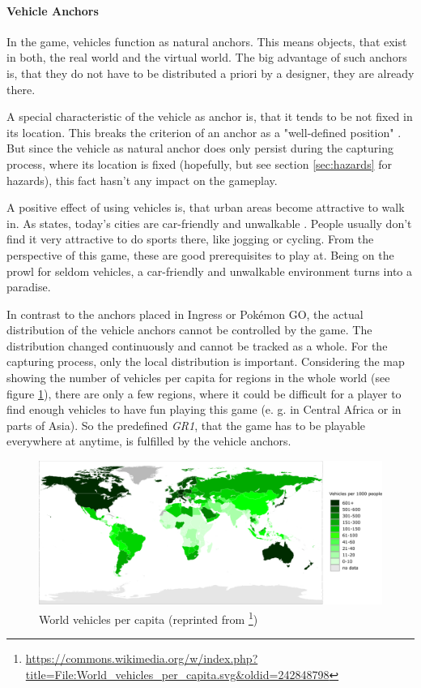 \paragraph{Vehicle Anchors}\label{par:vehicleAnchors}
In the game, vehicles function as natural anchors. This means objects, that exist in both, the real world and the virtual world. The big advantage of such anchors is, that they do not have to be distributed a priori by a designer, they are already there.

A special characteristic of the vehicle as anchor is, that it tends to be not fixed in its location. This breaks the criterion of an anchor as a "well-defined position" \citep{hock2014augmented}. But since the vehicle as natural anchor does only persist during the capturing process, where its location is fixed (hopefully, but see section \ref{sec:hazards} for hazards), this fact hasn't any impact on the gameplay.

A positive effect of using vehicles is, that urban areas become attractive to walk in. As \citeauthor{gehl2013cities} states, today's cities are car-friendly and unwalkable \citep{gehl2013cities}. People usually don't find it very attractive to do sports there, like jogging or cycling. From the perspective of this game, these are good prerequisites to play at. Being on the prowl for seldom vehicles, a car-friendly and unwalkable environment turns into a paradise.

In contrast to the anchors placed in Ingress or Pok\'{e}mon GO, the actual distribution of the vehicle anchors cannot be controlled by the game. The distribution changed continuously and cannot be tracked as a whole. For the capturing process, only the local distribution is important. Considering the map showing the number of vehicles per capita for regions in the whole world (see figure \ref{fig:worldVehicles}), there are only a few regions, where it could be difficult for a player to find enough vehicles to have fun playing this game (e. g. in Central Africa or in parts of Asia). So the predefined \emph{GR1}, that the game has to be playable everywhere at anytime, is fulfilled by the vehicle anchors.

\begin{figure}[btph]
  \centering
        \includegraphics[width=.95\linewidth]{gfx/world_vehicles_per_capita}
        \caption{World vehicles per capita (reprinted from \footnote{\url{https://commons.wikimedia.org/w/index.php?title=File:World_vehicles_per_capita.svg&oldid=242848798}})}
        \label{fig:worldVehicles}
\end{figure}

